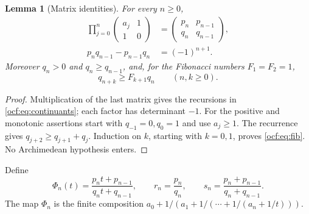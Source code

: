 \documentclass[11pt,a4paper]{article}
\numberwithin{equation}{section}
\newtheorem{lemma}[theorem]{Lemma}
\theoremstyle{definition}
\theoremstyle{remark}
\begin{document}
\begin{lemma}[Matrix identities]\label{ocf:lem:matrix}
For every $n\ge0$,
\begin{align}
 \prod_{j=0}^{n}\begin{pmatrix}a_j&1\\1&0\end{pmatrix}
  &=\begin{pmatrix}p_n&p_{n-1}\\q_n&q_{n-1}\end{pmatrix},\label{ocf:eq:matrix}\\
 p_nq_{n-1}-p_{n-1}q_n&=(-1)^{n+1}.\label{ocf:eq:det}
\end{align}
Moreover $q_n>0$ and $q_n\ge q_{n-1}$, and, for the Fibonacci numbers
$F_1=F_2=1$,
\begin{equation}\label{ocf:eq:fib}
 q_{n+k}\ge F_{k+1}q_n\qquad(n,k\ge0).
\end{equation}
\end{lemma}
\begin{proof}
Multiplication of the last matrix gives the recursions in
\eqref{ocf:eq:continuants}; each factor has determinant $-1$. For the positive
and monotonic assertions start with $q_{-1}=0,q_0=1$ and use $a_j\ge1$.
The recurrence gives $q_{j+2}\ge q_{j+1}+q_j$. Induction on $k$, starting
with $k=0,1$, proves \eqref{ocf:eq:fib}. No Archimedean hypothesis enters.
\end{proof}

Define
\begin{equation}\label{ocf:eq:Phi}
 \Phi_n(t)=\frac{p_nt+p_{n-1}}{q_nt+q_{n-1}},\qquad
 r_n=\frac{p_n}{q_n},\qquad
 s_n=\frac{p_n+p_{n-1}}{q_n+q_{n-1}}.
\end{equation}
The map $\Phi_n$ is the finite composition
$a_0+1/(a_1+1/(\cdots+1/(a_n+1/t)))$.
\end{document}
